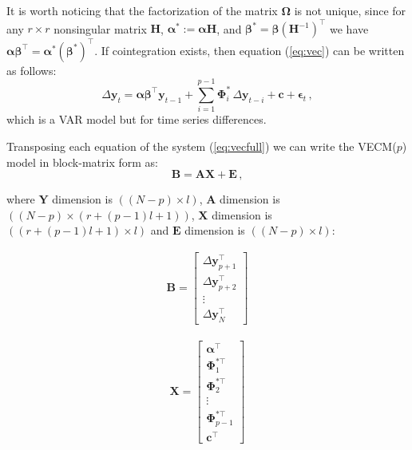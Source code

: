 It is worth noticing that the factorization of the matrix
$\boldsymbol\Omega$ is not unique, since for any $r \times r$
nonsingular matrix $\mathbf{H}$, $\boldsymbol{\alpha}^*:=\boldsymbol{\alpha}\mathbf{H}$,
and $\boldsymbol{\beta}^*=\boldsymbol{\beta}(\mathbf{H}^{-1})^\top$ we have
$\boldsymbol{\alpha\beta}^\top=\boldsymbol{\alpha}^*(\boldsymbol{\beta}^*)^\top$.
If cointegration exists, then equation (\ref{eq:vec}) can be written
as follows:
\begin{equation}\label{eq:vecfull}
\Delta\mathbf{y}_t 
= \boldsymbol{\alpha\beta}^\top\mathbf{y}_{t-1} 
  + \sum_{i=1}^{p-1}\boldsymbol{\Phi}_i^*\,\Delta\mathbf{y}_{t-i}
  + \mathbf{c} + \boldsymbol{\epsilon}_t\,,
\end{equation}
\noindent
which is a VAR model but for time series differences.


Transposing each equation of the system (\ref{eq:vecfull}) we can write
the VECM($p$) model in block-matrix form as:
\begin{equation}\label{eq:simpleveceq} %
\mathbf{B} = 
\mathbf{A} \mathbf{X} + 
\mathbf{E} \, , 
\end{equation}

\noindent where $\mathbf{Y}$ dimension is $((N-p)\times l)$, $\mathbf{A}$
dimension is $((N-p)\times(r+(p-1)l +1))$, $\mathbf{X}$ dimension is $((r+(p-1)l
+1)\times l)$ and $\mathbf{E}$ dimension is $((N-p)\times l)$:

\begin{align}
\label{eq:vecY}
\mathbf{B}
= \begin{bmatrix}
   \Delta\mathbf{y}_{p+1}^\top \\
   \Delta\mathbf{y}_{p+2}^\top \\
   \vdots \\
   \Delta\mathbf{y}_N^\top
   \end{bmatrix}
\end{align}

\begin{align}
\label{eq:vecX}
\mathbf{X}
= \begin{bmatrix}
   \boldsymbol{\alpha}^\top \\
   \boldsymbol{\Phi}_1^{*\top} \\
   \boldsymbol{\Phi}_2^{*\top} \\
   \vdots \\
   \boldsymbol{\Phi}_{p-1}^{*\top} \\
   \mathbf{c}^\top
   \end{bmatrix}
\end{align}

